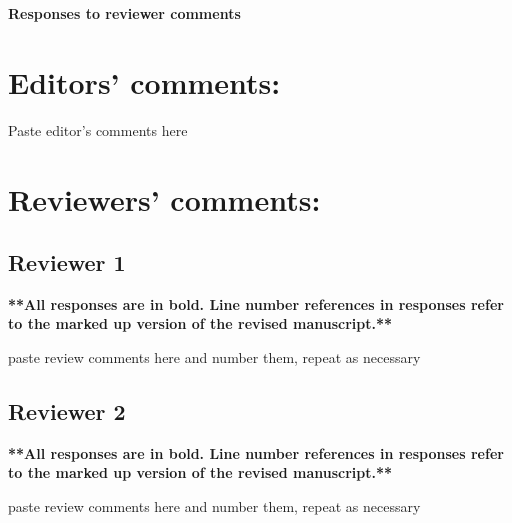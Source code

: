 \documentclass[12pt, letterpaper]{article}
\begin{document}
\begin{center}
    \textbf{\Large{Responses to reviewer comments}}
\end{center}

\section*{Editors’ comments:}

Paste editor's comments here

\section*{Reviewers' comments:}

\subsection*{Reviewer 1}

\begin{center}
    \textbf{**All responses are in bold. Line number references in responses refer to the marked up version of the revised manuscript.**}
\end{center}

paste review comments here and number them, repeat as necessary

\subsection*{Reviewer 2}

\begin{center}
    \textbf{**All responses are in bold. Line number references in responses refer to the marked up version of the revised manuscript.**}
\end{center}

paste review comments here and number them, repeat as necessary




\end{document}
